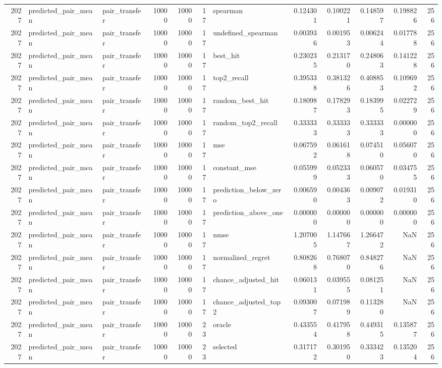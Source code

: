 \begin{tabular}{rllrrrlrrrrr}
2027 & predicted_pair_mean & pair_transfer & 10000 & 10000 & 17 & spearman & 0.124301 & 0.100221 & 0.148597 & 0.198826 & 256 \\
2027 & predicted_pair_mean & pair_transfer & 10000 & 10000 & 17 & undefined_spearman & 0.003936 & 0.001953 & 0.006244 & 0.017788 & 256 \\
2027 & predicted_pair_mean & pair_transfer & 10000 & 10000 & 17 & best_hit & 0.230235 & 0.213170 & 0.248063 & 0.141228 & 256 \\
2027 & predicted_pair_mean & pair_transfer & 10000 & 10000 & 17 & top2_recall & 0.395338 & 0.381326 & 0.408853 & 0.109692 & 256 \\
2027 & predicted_pair_mean & pair_transfer & 10000 & 10000 & 17 & random_best_hit & 0.180987 & 0.178293 & 0.183995 & 0.022729 & 256 \\
2027 & predicted_pair_mean & pair_transfer & 10000 & 10000 & 17 & random_top2_recall & 0.333333 & 0.333333 & 0.333333 & 0.000000 & 256 \\
2027 & predicted_pair_mean & pair_transfer & 10000 & 10000 & 17 & mse & 0.067592 & 0.061618 & 0.074510 & 0.056070 & 256 \\
2027 & predicted_pair_mean & pair_transfer & 10000 & 10000 & 17 & constant_mse & 0.055999 & 0.052333 & 0.060570 & 0.034755 & 256 \\
2027 & predicted_pair_mean & pair_transfer & 10000 & 10000 & 17 & prediction_below_zero & 0.006590 & 0.004363 & 0.009072 & 0.019310 & 256 \\
2027 & predicted_pair_mean & pair_transfer & 10000 & 10000 & 17 & prediction_above_one & 0.000000 & 0.000000 & 0.000000 & 0.000000 & 256 \\
2027 & predicted_pair_mean & pair_transfer & 10000 & 10000 & 17 & nmse & 1.207005 & 1.147667 & 1.266472 & NaN & 256 \\
2027 & predicted_pair_mean & pair_transfer & 10000 & 10000 & 17 & normalized_regret & 0.808268 & 0.768070 & 0.848276 & NaN & 256 \\
2027 & predicted_pair_mean & pair_transfer & 10000 & 10000 & 17 & chance_adjusted_hit & 0.060131 & 0.039555 & 0.081251 & NaN & 256 \\
2027 & predicted_pair_mean & pair_transfer & 10000 & 10000 & 17 & chance_adjusted_top2 & 0.093007 & 0.071989 & 0.113280 & NaN & 256 \\
2027 & predicted_pair_mean & pair_transfer & 10000 & 10000 & 23 & oracle & 0.433554 & 0.417958 & 0.449315 & 0.135877 & 256 \\
2027 & predicted_pair_mean & pair_transfer & 10000 & 10000 & 23 & selected & 0.317172 & 0.301950 & 0.333423 & 0.135204 & 256 \\

\end{tabular}
